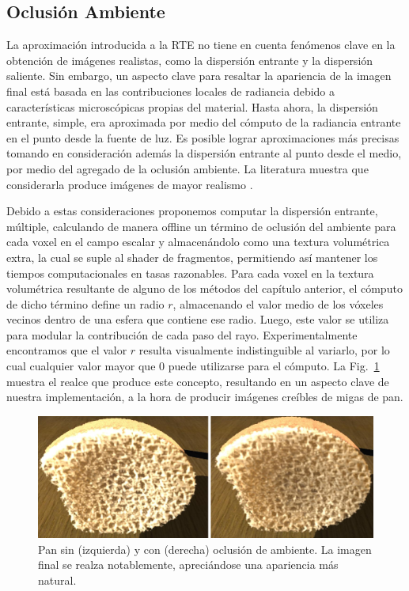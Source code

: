 \subsection{Oclusión Ambiente}

La aproximación introducida a la RTE no tiene en cuenta fenómenos clave en la obtención de imágenes realistas, como la dispersión entrante y la dispersión saliente.
Sin embargo, un aspecto clave para resaltar la apariencia de la imagen final está basada en las contribuciones locales de radiancia debido a características microscópicas propias del material.
Hasta ahora, la dispersión entrante, simple, era aproximada por medio del cómputo de la radiancia entrante en el punto desde la fuente de luz.
Es posible lograr aproximaciones más precisas tomando en consideración además la dispersión entrante al punto desde el medio, por medio del agregado de la oclusión ambiente.
La literatura muestra que considerarla produce imágenes de mayor realismo \cite{Hernell2010}.

Debido a estas consideraciones proponemos computar la dispersión entrante, múltiple, calculando de manera offline un término de oclusión del ambiente para cada voxel en el campo escalar y almacenándolo como una textura volumétrica extra, la cual se suple al shader de fragmentos, permitiendo así mantener los tiempos computacionales en tasas razonables.
Para cada voxel en la textura volumétrica resultante de alguno de los métodos del capítulo anterior, el cómputo de dicho término define un radio $r$, almacenando el valor medio de los vóxeles vecinos dentro de una esfera que contiene ese radio.
Luego, este valor se utiliza para modular la contribución de cada paso del rayo.
Experimentalmente encontramos que el valor $r$ resulta visualmente indistinguible al variarlo, por lo cual cualquier valor mayor que $0$ puede utilizarse para el cómputo.
La Fig.~\ref{fg:occlusion} muestra el realce que produce este concepto, resultando en un aspecto clave de nuestra implementación, a la hora de producir imágenes creíbles de migas de pan. 



\begin{figure}
\centerline{\includegraphics[width=13cm]{figures/occlusion}}
  \caption[Pan renderizado sin y con oclusión de ambiente]{Pan sin (izquierda) y con (derecha) oclusión de ambiente. La imagen final se realza notablemente, apreciándose una apariencia más natural.}
  \label{fg:occlusion}
\end{figure}
 
